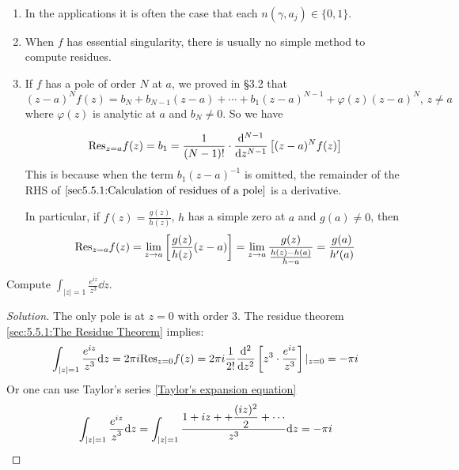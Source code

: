 \begin{remark}
    \,
    \begin{enumerate}[label=(\arabic*)]
        \item In the applications it is often the case that each  $ n(\gamma,a_j)\in\{0,1\} $.
        \item When  $ f  $ has essential  singularity, there is usually no simple method to compute residues.
        \item If  $ f  $ has a pole of order  $ N $ at  $ a $, we proved in \S 3.2 that 
        \begin{equation}
            (z-a)^Nf(z)=b_N+b_{N-1}(z-a)+\cdots+b_1(z-a)^{N-1}+\varphi(z)(z-a)^N,\,z\neq a
        \end{equation}
        where  $ \varphi(z) $ is analytic at   $ a  $ and  $ b_N \neq 0 $. So we have
        
        \begin{equation}\label{sec5.5.1:Calculation of residues of a pole}
            \mathrm{Res}_{z=a}f(z)=b_1=\frac{1}{(N-1)!}\cdot\frac{\mathrm{d} ^{N-1}}{\mathrm{d} z^{N-1}}\left[(z-a)^Nf(z)\right]
        \end{equation}
        This is because when the term  $ b_1(z-a)^{-1}  $ is omitted, the remainder of the RHS of  $ \eqref{sec5.5.1:Calculation of residues of a pole} $ is a derivative.

        In particular, if  $ f(z)=\frac{g(z)}{h(z)} $, $ h  $ has a simple zero at  $ a $ and  $ g(a)\neq 0 $, then 
        \begin{equation}
            \mathrm{Res}_{z=a}f(z)=\lim_{z\to a}\left[\frac{g(z) }{h(z)}(z-a)\right]=\lim_{z\to a}\frac{g(z)}{\frac{h(z)-h(a)}{h-a}}=\frac{g(a)}{h'(a)}
        \end{equation}  
    \end{enumerate}
    
\end{remark}
\begin{example}
    Compute  $ \int_{|z|=1}\frac{e^{iz}}{z^3}\dd z $.
\end{example}
\begin{proof}[Solution]
    The only pole is at  $z=0  $ with order  $ 3 $. The residue theorem  \ref{sec:5.5.1:The Residue Theorem} implies:
    \begin{equation}
        \int_{|z|=1}\frac{e^{iz}}{z^3}\mathrm{d} z=2\pi i \mathrm{Res}_{z=0}f(z)=2\pi i \frac{1 }{2!}\frac{\mathrm{d}^2}{\mathrm{d} z^2}\left[z^3\cdot\frac{e^{iz }}{z^3}\right]|_{z=0}=-\pi i
    \end{equation}
    Or one can use Taylor's series \eqref{Taylor's expansion equation}
    \begin{equation}
        \int_{|z|=1}\frac{\displaystyle e^{iz}}{\displaystyle z^3}\mathrm{d} z=\int_{|z|=1}\frac{\displaystyle1+iz++\frac{(iz)^2}{2}+\cdots}{z^3}\mathrm{d} z=-\pi i
    \end{equation}
\end{proof}
